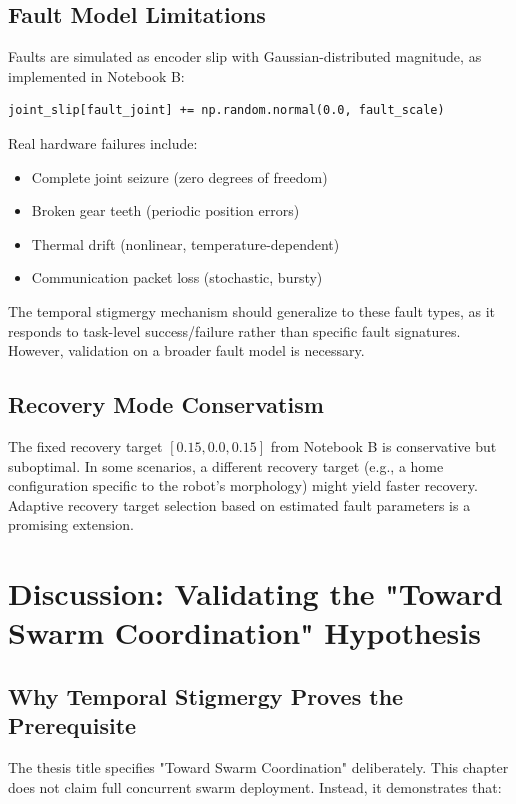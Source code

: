 \documentclass[12pt,a4paper,oneside]{report}
\begin{document}
\subsection{Fault Model Limitations}

Faults are simulated as encoder slip with Gaussian-distributed magnitude, as implemented in Notebook B:

\begin{verbatim}
joint_slip[fault_joint] += np.random.normal(0.0, fault_scale)
\end{verbatim}

Real hardware failures include:
\begin{itemize}
    \item Complete joint seizure (zero degrees of freedom)
    \item Broken gear teeth (periodic position errors)
    \item Thermal drift (nonlinear, temperature-dependent)
    \item Communication packet loss (stochastic, bursty)
\end{itemize}

The temporal stigmergy mechanism should generalize to these fault types, as it responds to task-level success/failure rather than specific fault signatures. However, validation on a broader fault model is necessary.

\subsection{Recovery Mode Conservatism}

The fixed recovery target $[0.15, 0.0, 0.15]$ from Notebook B is conservative but suboptimal. In some scenarios, a different recovery target (e.g., a home configuration specific to the robot's morphology) might yield faster recovery. Adaptive recovery target selection based on estimated fault parameters is a promising extension.

\section{Discussion: Validating the "Toward Swarm Coordination" Hypothesis}

\subsection{Why Temporal Stigmergy Proves the Prerequisite}

The thesis title specifies "Toward Swarm Coordination" deliberately. This chapter does not claim full concurrent swarm deployment. Instead, it demonstrates that:
\end{document}
